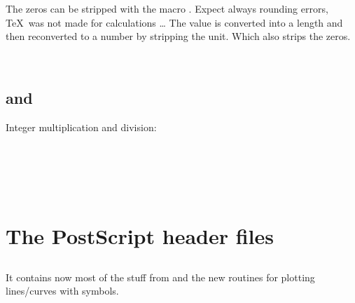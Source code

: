 \documentclass[11pt,english,BCOR10mm,DIV12,bibliography=totoc,parskip=false,smallheadings
    headexclude,footexclude,oneside]{pst-doc}
\begin{document}
The zeros can be stripped with the macro . Expect 
always rounding errors, \TeX\ was not made for calculations \ldots
The value is converted into a length and then reconverted to a 
number by stripping the unit. Which also strips the zeros.

\begin{LTXexample}[width=5cm]
\pstFPmul{} 
\pstFPstripZeros{\Result}{\Result}\Result\quad
\pstFPdiv{} 
\pstFPstripZeros{\Result}{\Result}\Result\\
\pstFPmul{} 
\pstFPstripZeros{\Result}{\Result}\Result\quad
\pstFPdiv{} 
\pstFPstripZeros{\Result}{\Result}\Result
\end{LTXexample}

\subsection{ and }
Integer multiplication and division:

\begin{BDef}
\\
\end{BDef}

\begin{LTXexample}[width=5cm]
\makeatletter
\pstFPMul{} \Result\quad
\pstFPDiv{} \Result\\
\pstFPMul{} \Result\quad
\pstFPDiv{} \Result\\
\pstFPMul{} \Result\quad
\pstFPDiv{} \Result
\makeatother
\end{LTXexample}

\section{The PostScript header files}
\subsection{}
It contains now most of the stuff from  and the new routines
for plotting lines/curves with symbols.
\end{document}
